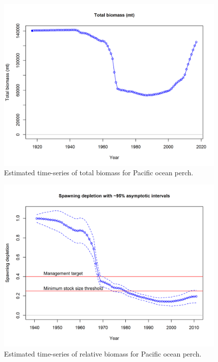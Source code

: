 \documentclass[12pt,]{article}
\begin{document}
\FloatBarrier

\begin{figure}
\centering
\includegraphics{r4ss/plots_mod1/ts1_Total_biomass_(mt).png}
\caption{Estimated time-series of total biomass for Pacific ocean perch.
\label{fig:total_bio}}
\end{figure}

\FloatBarrier

\begin{figure}
\centering
\includegraphics{r4ss/plots_mod1/ts9_Spawning_depletion_with_95_asymptotic_intervals_intervals.png}
\caption{Estimated time-series of relative biomass for Pacific ocean
perch. \label{fig:depl}}
\end{figure}
\end{document}
